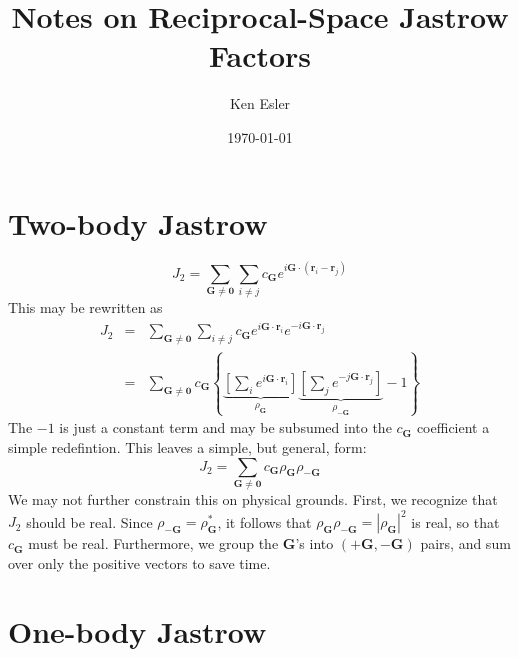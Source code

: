 \documentclass{article}
\title{Notes on Reciprocal-Space Jastrow Factors}
\date{\today}
\author{Ken Esler}
\newcommand{\vG}{\mathbf{G}}
\newcommand{\vr}{\mathbf{r}}
\begin{document}
\maketitle
\section{Two-body Jastrow}
\begin{equation}
J_2 = \sum_{\vG\neq \mathbf{0}}\sum_{i\neq j} c_\vG e^{i\vG\cdot(\vr_i-\vr_j)}
\end{equation}
This may be rewritten as
\begin{eqnarray}
J_2 & = & \sum_{\vG\neq \mathbf{0}}\sum_{i\neq j} c_\vG e^{i\vG\cdot\vr_i}e^{-i\vG\cdot\vr_j} \\
& = & \sum_{\vG\neq \mathbf{0}} c_\vG \left\{
\underbrace{\left[\sum_i e^{i\vG\cdot\vr_i} \right]}_{\rho_\vG}
\underbrace{\left[\sum_j e^{-j\vG\cdot\vr_j} \right]}_{\rho_{-\vG}}  -1 \right\}
\end{eqnarray}
The $-1$ is just a constant term and may be subsumed into the $c_\vG$
coefficient a simple redefintion.  This leaves a simple, but general, form:
\begin{equation}
J_2 = \sum_{\vG\neq\mathbf{0}} c_\vG \rho_\vG \rho_{-\vG}
\end{equation}
We may not further constrain this on physical grounds.  First, we
recognize that $J_2$ should be real.  Since $\rho_{-\vG} =
\rho_\vG^*$, it follows that $\rho_{\vG}\rho_{-\vG} = |\rho_\vG|^2$ is
real, so that $c_\vG$ must be real.  Furthermore, we group the $\vG$'s
into $(+\vG, -\vG)$ pairs, and sum over only the positive vectors to
save time.




\section{One-body Jastrow}
\end{document}
